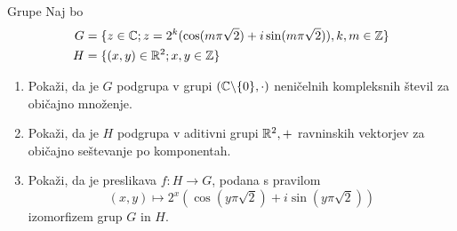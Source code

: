 \begin{frame}{Grupe}
	Naj bo
	\begin{align*}
		G &= \{z\in \mathbb{C}; z = 2^k (\cos (m\pi\sqrt{2}) + i \sin(m\pi\sqrt{2})), k,m \in \mathbb{Z}\} \\
		H &= \{(x,y)\in \mathbb{R} ^2; x,y \in \mathbb{Z} \}
	\end{align*}
	
	\begin{enumerate}
		\item
			Pokaži, da je $G$ podgrupa v grupi $(\mathbb{C} \backslash \{0\}, \cdot)$
			neničelnih kompleksnih števil za običajno množenje.
		\item
			Pokaži, da je $H$ podgrupa v aditivni grupi $\mathbb{R}^2, +$
			ravninskih vektorjev za običajno seštevanje po komponentah.
		\item
			Pokaži, da je preslikava $f:H\to G$, podana s pravilom
			$$
			(x,y) \mapsto 2^x (\cos (y\pi\sqrt{2}) + i \sin (y\pi\sqrt{2}))
			$$
			izomorfizem grup $G$ in $H$.
	\end{enumerate}
\end{frame}
